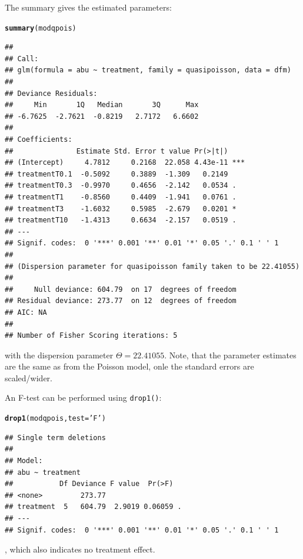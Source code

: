 \documentclass{scrartcl}\usepackage[]{graphicx}\usepackage[]{color}
\makeatletter
\newcommand{\hlstr}[1]{\textcolor[rgb]{0.192,0.494,0.8}{#1}}%
\newcommand{\hlstd}[1]{\textcolor[rgb]{0.345,0.345,0.345}{#1}}%
\newcommand{\hlkwc}[1]{\textcolor[rgb]{0.333,0.667,0.333}{#1}}%
\newcommand{\hlkwd}[1]{\textcolor[rgb]{0.737,0.353,0.396}{\textbf{#1}}}%
\newenvironment{kframe}{%
 \def\at@end@of@kframe{}%
 \ifinner\ifhmode%
  \def\at@end@of@kframe{\end{minipage}}%
  \begin{minipage}{\columnwidth}%
 \fi\fi%
 \def\FrameCommand##1{\hskip\@totalleftmargin \hskip-\fboxsep
 \colorbox{shadecolor}{##1}\hskip-\fboxsep
     \hskip-\linewidth \hskip-\@totalleftmargin \hskip\columnwidth}%
 \MakeFramed {\advance\hsize-\width
   \@totalleftmargin\z@ \linewidth\hsize
   \@setminipage}}%
 {\par\unskip\endMakeFramed%
 \at@end@of@kframe}
\newenvironment{knitrout}{}{} %
\makeatother
\begin{document}
The summary gives the estimated parameters:
\begin{knitrout}
\color{fgcolor}\begin{kframe}
\begin{alltt}
\hlkwd{summary}\hlstd{(modqpois)}
\end{alltt}
\begin{verbatim}
## 
## Call:
## glm(formula = abu ~ treatment, family = quasipoisson, data = dfm)
## 
## Deviance Residuals: 
##     Min       1Q   Median       3Q      Max  
## -6.7625  -2.7621  -0.8219   2.7172   6.6602  
## 
## Coefficients:
##               Estimate Std. Error t value Pr(>|t|)    
## (Intercept)     4.7812     0.2168  22.058 4.43e-11 ***
## treatmentT0.1  -0.5092     0.3889  -1.309   0.2149    
## treatmentT0.3  -0.9970     0.4656  -2.142   0.0534 .  
## treatmentT1    -0.8560     0.4409  -1.941   0.0761 .  
## treatmentT3    -1.6032     0.5985  -2.679   0.0201 *  
## treatmentT10   -1.4313     0.6634  -2.157   0.0519 .  
## ---
## Signif. codes:  0 '***' 0.001 '**' 0.01 '*' 0.05 '.' 0.1 ' ' 1
## 
## (Dispersion parameter for quasipoisson family taken to be 22.41055)
## 
##     Null deviance: 604.79  on 17  degrees of freedom
## Residual deviance: 273.77  on 12  degrees of freedom
## AIC: NA
## 
## Number of Fisher Scoring iterations: 5
\end{verbatim}
\end{kframe}
\end{knitrout}

with the dispersion parameter $\Theta = 22.41055$. 
Note, that the parameter estimates are the same as from the Poisson model, onle the standard errors are scaled/wider.

An F-test can be performed using \texttt{drop1()}:
\begin{knitrout}
\color{fgcolor}\begin{kframe}
\begin{alltt}
\hlkwd{drop1}\hlstd{(modqpois,} \hlkwc{test} \hlstd{=} \hlstr{'F'}\hlstd{)}
\end{alltt}
\begin{verbatim}
## Single term deletions
## 
## Model:
## abu ~ treatment
##           Df Deviance F value  Pr(>F)  
## <none>         273.77                  
## treatment  5   604.79  2.9019 0.06059 .
## ---
## Signif. codes:  0 '***' 0.001 '**' 0.01 '*' 0.05 '.' 0.1 ' ' 1
\end{verbatim}
\end{kframe}
\end{knitrout}
, which also indicates no treatment effect.
\end{document}
